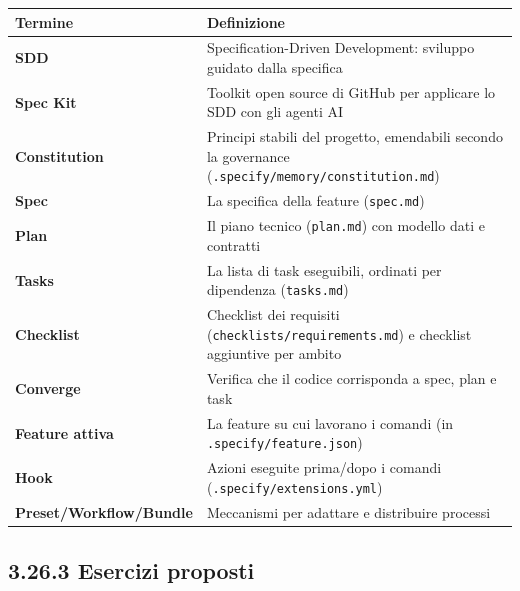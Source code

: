 \documentclass[
  italian,
  10pt,
]{book}
\newcounter{none} %
\begin{document}
{\def\LTcaptype{none} %
\begin{longtable}[]{@{}
  >{\raggedright\arraybackslash}p{}
  >{\raggedright\arraybackslash}p{}@{}}
\toprule\noalign{}
\begin{minipage}[b]{\linewidth}\raggedright
Termine
\end{minipage} & \begin{minipage}[b]{\linewidth}\raggedright
Definizione
\end{minipage} \\
\midrule\noalign{}
\endhead
\bottomrule\noalign{}
\endlastfoot
\textbf{SDD} & Specification-Driven Development: sviluppo guidato dalla
specifica \\
\textbf{Spec Kit} & Toolkit open source di GitHub per applicare lo SDD
con gli agenti AI \\
\textbf{Constitution} & Principi stabili del progetto, emendabili
secondo la governance (\texttt{.specify/memory/constitution.md}) \\
\textbf{Spec} & La specifica della feature (\texttt{spec.md}) \\
\textbf{Plan} & Il piano tecnico (\texttt{plan.md}) con modello dati e
contratti \\
\textbf{Tasks} & La lista di task eseguibili, ordinati per dipendenza
(\texttt{tasks.md}) \\
\textbf{Checklist} & Checklist dei requisiti
(\texttt{checklists/requirements.md}) e checklist aggiuntive per
ambito \\
\textbf{Converge} & Verifica che il codice corrisponda a spec, plan e
task \\
\textbf{Feature attiva} & La feature su cui lavorano i comandi (in
\texttt{.specify/feature.json}) \\
\textbf{Hook} & Azioni eseguite prima/dopo i comandi
(\texttt{.specify/extensions.yml}) \\
\textbf{Preset/Workflow/Bundle} & Meccanismi per adattare e distribuire
processi \\
\end{longtable}
}

\subsection{3.26.3 Esercizi proposti}\label{esercizi-proposti}
\end{document}
